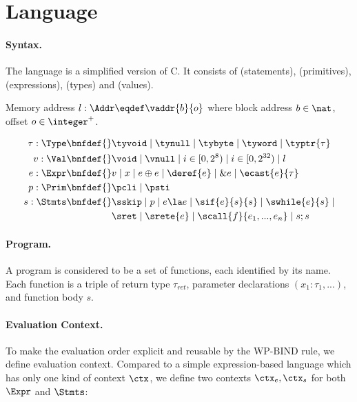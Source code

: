 \section{Language}
\label{sec:language}

\paragraph{Syntax.}

The language is a simplified version of C. It consists of \Stmts{} (statements), \Prim{} (primitives),
\Expr{} (expressions), \Type{} (types) and \Val{} (values).

Memory address $l: \Addr \eqdef \vaddr{b}{o}$ where block address $b \in \nat$, offset $o \in \integer^{+}$.

\begin{align*}
    \tau : \Type \bnfdef{}&
        \tyvoid \mid \tynull \mid \tybyte \mid \tyword \mid \typtr{\tau}
\\
    v : \Val \bnfdef{}&
        \void \mid \vnull \mid i \in [0, 2^8) \mid i \in [0, 2^{32}) \mid l
\\
    e : \Expr \bnfdef{}&
        v \mid x \mid e \oplus e \mid \deref{e} \mid \& e \mid \ecast{e}{\tau}
\\
    p : \Prim \bnfdef{}&
        \pcli \mid \psti
\\
    s : \Stmts \bnfdef{}&
        \sskip \mid p \mid e \la e \mid \sif{e}{s}{s} \mid \swhile{e}{s} \mid \\&
        \sret \mid \srete{e} \mid \scall{f}{e_1, ..., e_n} \mid s ; s
\\
\end{align*}

\paragraph{Program.}

A program is considered to be a set of functions, each identified by its name. Each
function is a triple of return type $\tau_{ret}$, parameter declarations $(x_1 : \tau_1, ...)$,
and function body $s$.

\paragraph{Evaluation Context.}

To make the evaluation order explicit and reusable by the $\text{WP-BIND}$ rule, we define evaluation context.
Compared to a simple expression-based language which has only one kind of context $\ctx$, we define two contexts
$\ctx_e, \ctx_s$ for both $\Expr$ and $\Stmts$:

